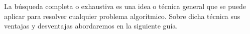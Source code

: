 La búsqueda completa o exhaustiva es una idea o técnica general que se puede aplicar para resolver cualquier problema algorítmico. Sobre dicha técnica sus ventajas y desventajas abordaremos en la siguiente guía.


